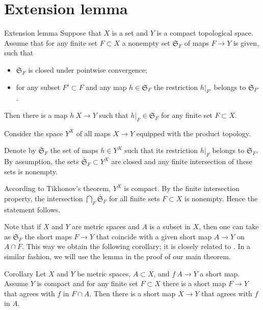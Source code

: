 \section{Extension lemma}\label{Finite-whole extension lemma}

\begin{thm}{Extension lemma}\label{lem:finite-whole}
Suppose that $X$ is a set 
and $Y$ is a compact topological space.
Assume that for any finite set $F\subset X$ 
a nonempty set $\mathfrak{S}_F$ of maps  $F\to Y$ is given, such that
\begin{itemize}
\item $\mathfrak{S}_F$ is closed under pointwise convergence;
\item for any subset $F'\subset F$ and any map $h\in \mathfrak{S}_F$
the restriction $h|_{F'}$ belongs to $\mathfrak{S}_{F'}$. 
\end{itemize}

Then there is a map $h\: X\to Y$ such that $h|_F\in \mathfrak{S}_F$ for any finite set $F\subset X$.
\end{thm}

Consider the space $Y^X$ of all maps $X\to Y$ equipped with the product topology.

Denote by $\bar{\mathfrak{S}}_F$ the set of maps $h\in Y^X$ such that its restriction $h|_F$ belongs to $\mathfrak{S}_F$.
By assumption, the sets $\bar{\mathfrak{S}}_F\subset Y^X$ are closed and any finite intersection of these sets is nonempty.

According to Tikhonov's theorem, $Y^X$ is compact.
By the finite intersection property, the intersection $\bigcap_F\bar{\mathfrak{S}}_F$ for all finite sets $F\subset X$ is nonempty.
Hence the statement follows.
\qeds

Note that if $X$ and $Y$ are metric spaces and $A$ is a subset in $X$,
then one can take as $\mathfrak{S}_F$ the short maps $F\to Y$ that coincide with a given short map $A\to Y$ on $A\cap F$.
This way we obtain the following corollary; it is closely related to \cite[Proposition 5.2]{lang-shroeder}.
In a similar fashion, we will use the lemma in the proof of our main theorem.

\begin{thm}{Corollary}
Let $X$ and $Y$ be metric spaces, $A\subset X$, and $f\:A\to Y$ a short map.
Assume $Y$ is compact and for any finite set $F\subset X$ there is a short map $F\to Y$ that agrees with $f$ in $F\cap A$.
Then there is a short map $X\to Y$ that agrees with $f$ in $A$.
\end{thm}
